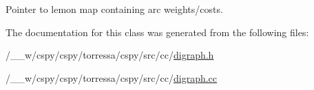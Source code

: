 Pointer to lemon map containing arc weights/costs. 



The documentation for this class was generated from the following files\+:\begin{DoxyCompactItemize}
\item 
/\+\_\+\+\_\+w/cspy/cspy/torressa/cspy/src/cc/\hyperlink{digraph_8h}{digraph.\+h}\item 
/\+\_\+\+\_\+w/cspy/cspy/torressa/cspy/src/cc/\hyperlink{digraph_8cc}{digraph.\+cc}\end{DoxyCompactItemize}
